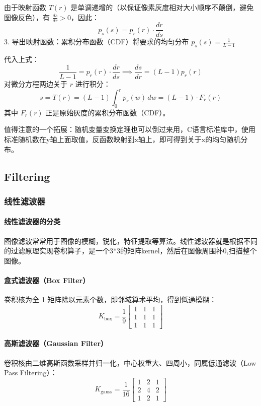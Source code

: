 \documentclass{ctexart}
\begin{document}
由于映射函数 $T(r)$ 是单调递增的（以保证像素灰度相对大小顺序不颠倒，避免图像反色），有 $\frac{ds}{dr} > 0$，因此：$$p_s(s) = p_r(r) \cdot \frac{dr}{ds}$$3. 导出映射函数：累积分布函数（CDF）将要求的均匀分布 $p_s(s) = \frac{1}{L-1}$ 

代入上式：$$\frac{1}{L-1} = p_r(r) \cdot \frac{dr}{ds} \implies \frac{ds}{dr} = (L-1) p_r(r)$$对微分方程两边关于 $r$ 进行积分：$$s = T(r) = (L-1) \int_0^r p_r(w) \, dw = (L-1) \cdot F_r(r)$$其中 $F_r(r)$ 正是原始灰度的累积分布函数（CDF）。

值得注意的一个拓展：随机变量变换定理也可以倒过来用，C语言标准库中，使用标准随机数在y轴上面取值，反函数映射到x轴上，即可得到关于x的均匀随机分布。

\subsection{Filtering}

\subsubsection{线性滤波器}
\paragraph{线性滤波器的分类}
图像滤波常常用于图像的模糊，锐化，特征提取等算法。线性滤波器就是根据不同的过滤原理实现卷积算子，是一个3*3的矩阵kernel，然后在图像周围补0,扫描整个图像。
\paragraph{盒式滤波器（Box Filter）}
卷积核为全 1 矩阵除以元素个数，即邻域算术平均，得到低通模糊：
$$K_{\text{box}} = \frac{1}{9}\begin{bmatrix} 1 & 1 & 1 \\ 1 & 1 & 1 \\ 1 & 1 & 1 \end{bmatrix}$$

\paragraph{高斯滤波器（Gaussian Filter）}
卷积核由二维高斯函数采样并归一化，中心权重大、四周小，同属低通滤波（Low Pass Filtering）：
$$K_{\text{gauss}} = \frac{1}{16}\begin{bmatrix} 1 & 2 & 1 \\ 2 & 4 & 2 \\ 1 & 2 & 1 \end{bmatrix}$$
\end{document}
